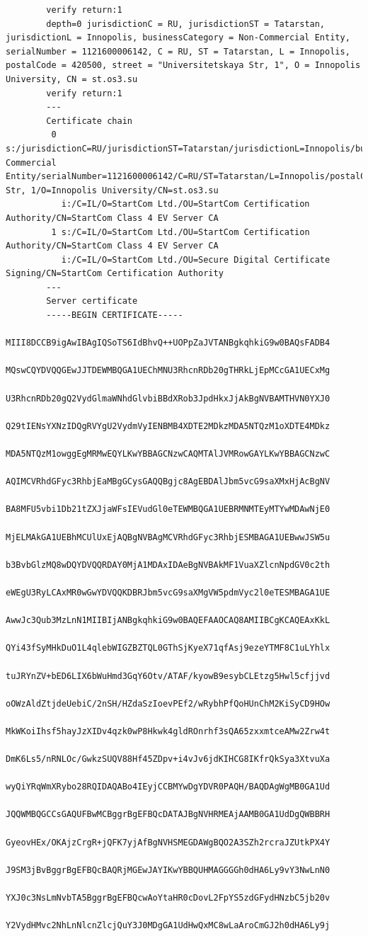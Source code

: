\documentclass[10pt]{article}
\begin{document}
\begin{enumerate}
\begin{verbatim}
        verify return:1
        depth=0 jurisdictionC = RU, jurisdictionST = Tatarstan, jurisdictionL = Innopolis, businessCategory = Non-Commercial Entity, serialNumber = 1121600006142, C = RU, ST = Tatarstan, L = Innopolis, postalCode = 420500, street = "Universitetskaya Str, 1", O = Innopolis University, CN = st.os3.su
        verify return:1
        ---
        Certificate chain
         0 s:/jurisdictionC=RU/jurisdictionST=Tatarstan/jurisdictionL=Innopolis/businessCategory=Non-Commercial Entity/serialNumber=1121600006142/C=RU/ST=Tatarstan/L=Innopolis/postalCode=420500/street=Universitetskaya Str, 1/O=Innopolis University/CN=st.os3.su
           i:/C=IL/O=StartCom Ltd./OU=StartCom Certification Authority/CN=StartCom Class 4 EV Server CA
         1 s:/C=IL/O=StartCom Ltd./OU=StartCom Certification Authority/CN=StartCom Class 4 EV Server CA
           i:/C=IL/O=StartCom Ltd./OU=Secure Digital Certificate Signing/CN=StartCom Certification Authority
        ---
        Server certificate
        -----BEGIN CERTIFICATE-----
        MIII8DCCB9igAwIBAgIQSoTS6IdBhvQ++UOPpZaJVTANBgkqhkiG9w0BAQsFADB4
        MQswCQYDVQQGEwJJTDEWMBQGA1UEChMNU3RhcnRDb20gTHRkLjEpMCcGA1UECxMg
        U3RhcnRDb20gQ2VydGlmaWNhdGlvbiBBdXRob3JpdHkxJjAkBgNVBAMTHVN0YXJ0
        Q29tIENsYXNzIDQgRVYgU2VydmVyIENBMB4XDTE2MDkzMDA5NTQzM1oXDTE4MDkz
        MDA5NTQzM1owggEgMRMwEQYLKwYBBAGCNzwCAQMTAlJVMRowGAYLKwYBBAGCNzwC
        AQIMCVRhdGFyc3RhbjEaMBgGCysGAQQBgjc8AgEBDAlJbm5vcG9saXMxHjAcBgNV
        BA8MFU5vbi1Db21tZXJjaWFsIEVudGl0eTEWMBQGA1UEBRMNMTEyMTYwMDAwNjE0
        MjELMAkGA1UEBhMCUlUxEjAQBgNVBAgMCVRhdGFyc3RhbjESMBAGA1UEBwwJSW5u
        b3BvbGlzMQ8wDQYDVQQRDAY0MjA1MDAxIDAeBgNVBAkMF1VuaXZlcnNpdGV0c2th
        eWEgU3RyLCAxMR0wGwYDVQQKDBRJbm5vcG9saXMgVW5pdmVyc2l0eTESMBAGA1UE
        AwwJc3Qub3MzLnN1MIIBIjANBgkqhkiG9w0BAQEFAAOCAQ8AMIIBCgKCAQEAxKkL
        QYi43fSyMHkDuO1L4qlebWIGZBZTQL0GThSjKyeX71qfAsj9ezeYTMF8C1uLYhlx
        tuJRYnZV+bED6LIX6bWuHmd3GqY6Otv/ATAF/kyowB9esybCLEtzg5Hwl5cfjjvd
        oOWzAldZtjdeUebiC/2nSH/HZdaSzIoevPEf2/wRybhPfQoHUnChM2KiSyCD9HOw
        MkWKoiIhsf5hayJzXIDv4qzk0wP8Hkwk4gldROnrhf3sQA65zxxmtceAMw2Zrw4t
        DmK6Ls5/nRNLOc/GwkzSUQV88Hf45ZDpv+i4vJv6jdKIHCG8IKfrQkSya3XtvuXa
        wyQiYRqWmXRybo28RQIDAQABo4IEyjCCBMYwDgYDVR0PAQH/BAQDAgWgMB0GA1Ud
        JQQWMBQGCCsGAQUFBwMCBggrBgEFBQcDATAJBgNVHRMEAjAAMB0GA1UdDgQWBBRH
        GyeovHEx/OKAjzCrgR+jQFK7yjAfBgNVHSMEGDAWgBQO2A3SZh2rcraJZUtkPX4Y
        J9SM3jBvBggrBgEFBQcBAQRjMGEwJAYIKwYBBQUHMAGGGGh0dHA6Ly9vY3NwLnN0
        YXJ0c3NsLmNvbTA5BggrBgEFBQcwAoYtaHR0cDovL2FpYS5zdGFydHNzbC5jb20v
        Y2VydHMvc2NhLnNlcnZlcjQuY3J0MDgGA1UdHwQxMC8wLaAroCmGJ2h0dHA6Ly9j

\end{verbatim}
\end{enumerate}
\end{document}
